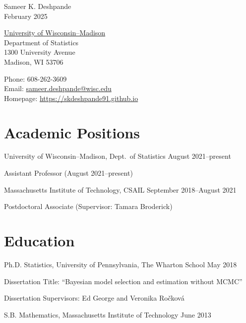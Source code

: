 \documentclass[10pt]{article}
\renewenvironment{itemize}{
  \begin{list}{}{
    \setlength{\leftmargin}{1.5em}
  }
}{
  \end{list}
}
\begin{document}
\begin{center}
{ \Large Sameer K. Deshpande } \\
February 2025
\end{center}

\begin{minipage}{0.4\linewidth}
  \href{http://www.wisc.edu}{University of Wisconsin--Madison} \\
  Department of Statistics \\
  1300 University Avenue \\
  Madison, WI 53706
\end{minipage}
\hfill
\begin{minipage}{0.42\linewidth}
Phone: 608-262-3609 \\
Email: \url{sameer.deshpande@wisc.edu} \\
Homepage: \url{https://skdeshpande91.github.io}
\end{minipage}

\section*{Academic Positions}
\begin{itemize}
\item{University of Wisconsin--Madison, Dept.\ of Statistics \hfill August 2021--present}
\begin{itemize}
\item{Assistant Professor (August 2021--present)}
\end{itemize}
\item{Massachusetts Institute of Technology, CSAIL \hfill September 2018--August 2021}
\begin{itemize}
\item{Postdoctoral Associate (Supervisor: Tamara Broderick)}
\end{itemize}
\end{itemize}

\section*{Education}
\begin{itemize}
\item{Ph.D. Statistics, University of Pennsylvania, The Wharton School \hfill May 2018}
\begin{itemize}
\item{Dissertation Title: ``Bayesian model selection and estimation without MCMC''}
\item{Dissertation Supervisors: Ed George and Veronika Ro\v{c}kov\'{a}}
\end{itemize}
\item{S.B. Mathematics, Massachusetts Institute of Technology \hfill June 2013}
\end{itemize}
\end{document}
